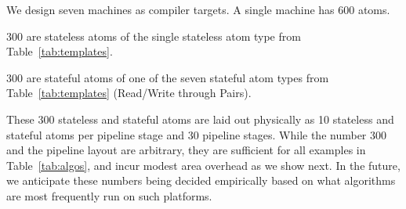 We design seven \absmachine machines as compiler targets. A single \absmachine
machine has 600 atoms.
\begin{CompactEnumerate}
\item 300 are stateless atoms of the single stateless atom type from
Table~\ref{tab:templates}.
\item 300 are stateful atoms of one of the seven stateful atom types from
Table~\ref{tab:templates} (Read/Write through Pairs).
\end{CompactEnumerate}
These 300 stateless and stateful atoms are laid out physically as 10 stateless
and stateful atoms per pipeline stage and 30 pipeline stages. While the number
300 and the pipeline layout are arbitrary, they are sufficient for all examples
in Table~\ref{tab:algos}, and incur modest area overhead as we show next. In
the future, we anticipate these numbers being decided empirically based on what
algorithms are most frequently run on such platforms.

